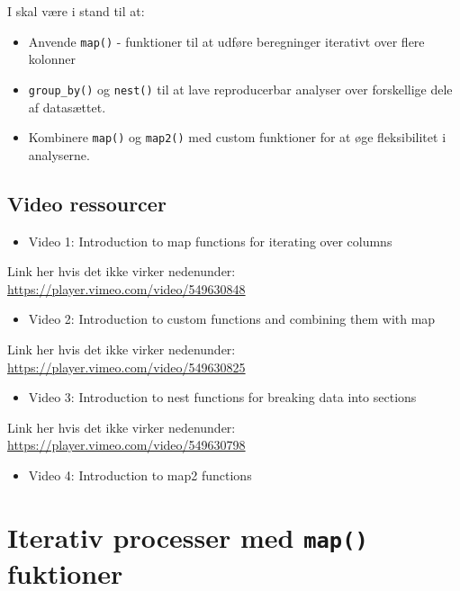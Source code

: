 \documentclass[
]{book}
\providecommand{\tightlist}{%
  \setlength{\itemsep}{0pt}\setlength{\parskip}{0pt}}
\begin{document}
I skal være i stand til at:

\begin{itemize}
\tightlist
\item
  Anvende \texttt{map()} - funktioner til at udføre beregninger iterativt over flere kolonner
\item
  \texttt{group\_by()} og \texttt{nest()} til at lave reproducerbar analyser over forskellige dele af datasættet.
\item
  Kombinere \texttt{map()} og \texttt{map2()} med custom funktioner for at øge fleksibilitet i analyserne.
\end{itemize}

\hypertarget{video-ressourcer-3}{%
\subsection{Video ressourcer}\label{video-ressourcer-3}}

\begin{itemize}
\tightlist
\item
  Video 1: Introduction to map functions for iterating over columns
\end{itemize}

Link her hvis det ikke virker nedenunder: \url{https://player.vimeo.com/video/549630848}

\begin{itemize}
\tightlist
\item
  Video 2: Introduction to custom functions and combining them with map
\end{itemize}

Link her hvis det ikke virker nedenunder: \url{https://player.vimeo.com/video/549630825}

\begin{itemize}
\tightlist
\item
  Video 3: Introduction to nest functions for breaking data into sections
\end{itemize}

Link her hvis det ikke virker nedenunder: \url{https://player.vimeo.com/video/549630798}

\begin{itemize}
\tightlist
\item
  Video 4: Introduction to map2 functions
\end{itemize}

\hypertarget{iterativ-processer-med-map-fuktioner}{%
\section{\texorpdfstring{Iterativ processer med \texttt{map()} fuktioner}{Iterativ processer med map() fuktioner}}\label{iterativ-processer-med-map-fuktioner}}
\end{document}
